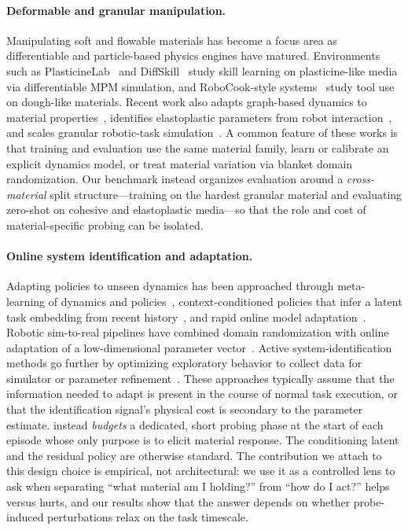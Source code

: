 \paragraph{Deformable and granular manipulation.}
Manipulating soft and flowable materials has become a focus area as differentiable and particle-based physics engines have matured. Environments such as PlasticineLab~\cite{huang2022plasticinelab} and DiffSkill~\cite{lin2022diffskill} study skill learning on plasticine-like media via differentiable MPM simulation, and RoboCook-style systems~\cite{shi2023robocook,shi2022robocraft} study tool use on dough-like materials. Recent work also adapts graph-based dynamics to material properties~\cite{zhang2024adaptigraph}, identifies elastoplastic parameters from robot interaction~\cite{yang2025differentiable}, and scales granular robotic-task simulation~\cite{millard2023granulargym}. A common feature of these works is that training and evaluation use the same material family, learn or calibrate an explicit dynamics model, or treat material variation via blanket domain randomization. Our benchmark instead organizes evaluation around a \emph{cross-material} split structure---training on the hardest granular material and evaluating zero-shot on cohesive and elastoplastic media---so that the role and cost of material-specific probing can be isolated.

\paragraph{Online system identification and adaptation.}
Adapting policies to unseen dynamics has been approached through meta-learning of dynamics and policies~\cite{finn2017model,nagabandi2019learning}, context-conditioned policies that infer a latent task embedding from recent history~\cite{rakelly2019efficient,zintgraf2021varibad}, and rapid online model adaptation~\cite{nagabandi2018deep,clavera2019modelbased}. Robotic sim-to-real pipelines have combined domain randomization with online adaptation of a low-dimensional parameter vector~\cite{yu2017preparing,peng2018sim2real}. Active system-identification methods go further by optimizing exploratory behavior to collect data for simulator or parameter refinement~\cite{memmel2024asid}. These approaches typically assume that the information needed to adapt is present in the course of normal task execution, or that the identification signal's physical cost is secondary to the parameter estimate. \PTA{} instead \emph{budgets} a dedicated, short probing phase at the start of each episode whose only purpose is to elicit material response. The conditioning latent and the residual policy are otherwise standard. The contribution we attach to this design choice is empirical, not architectural: we use it as a controlled lens to ask when separating ``what material am I holding?'' from ``how do I act?'' helps versus hurts, and our results show that the answer depends on whether probe-induced perturbations relax on the task timescale.

